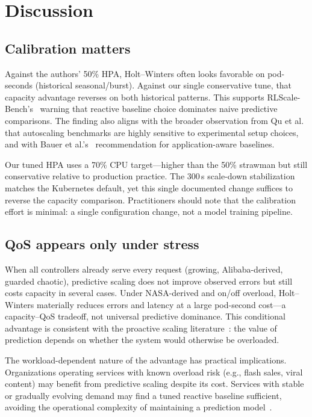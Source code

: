 \documentclass[journal]{IEEEtran}
\begin{document}
\section{Discussion}

\subsection{Calibration matters}
Against the authors' 50\% HPA, Holt--Winters often looks favorable on pod-seconds (historical seasonal/burst). Against our single conservative tune, that capacity advantage reverses on both historical patterns. This supports RLScale-Bench's~\cite{rlscale2026} warning that reactive baseline choice dominates naive predictive comparisons. The finding also aligns with the broader observation from Qu et al.~\cite{qu2018} that autoscaling benchmarks are highly sensitive to experimental setup choices, and with Bauer et al.'s~\cite{bauer2017} recommendation for application-aware baselines.

Our tuned HPA uses a 70\% CPU target---higher than the 50\% strawman but still conservative relative to production practice. The 300\,s scale-down stabilization matches the Kubernetes default, yet this single documented change suffices to reverse the capacity comparison. Practitioners should note that the calibration effort is minimal: a single configuration change, not a model training pipeline.

\subsection{QoS appears only under stress}
When all controllers already serve every request (growing, Alibaba-derived, guarded chaotic), predictive scaling does not improve observed errors but still costs capacity in several cases. Under NASA-derived and on/off overload, Holt--Winters materially reduces errors and latency at a large pod-second cost---a capacity--QoS tradeoff, not universal predictive dominance. This conditional advantage is consistent with the proactive scaling literature~\cite{abdullah2022, pahpa2026}: the value of prediction depends on whether the system would otherwise be overloaded.

The workload-dependent nature of the advantage has practical implications. Organizations operating services with known overload risk (e.g., flash sales, viral content) may benefit from predictive scaling despite its cost. Services with stable or gradually evolving demand may find a tuned reactive baseline sufficient, avoiding the operational complexity of maintaining a prediction model~\cite{rzadca2020}.
\end{document}
